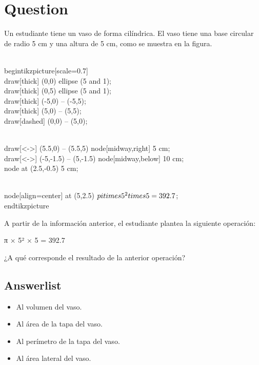 \documentclass[
]{article}
\author{}
\date{\vspace{-2.5em}}
\providecommand{\tightlist}{%
  \setlength{\itemsep}{0pt}\setlength{\parskip}{0pt}}
\begin{document}
\section{Question}\label{question}

Un estudiante tiene un vaso de forma cilíndrica. El vaso tiene una base
circular de radio 5 cm y una altura de 5 cm, como se muestra en la
figura.

\begin{center}
\\begin{tikzpicture}[scale=0.7]
  \\draw[thick] (0,0) ellipse (5 and 1);
  \\draw[thick] (0,5) ellipse (5 and 1);
  \\draw[thick] (-5,0) -- (-5,5);
  \\draw[thick] (5,0) -- (5,5);
  \\draw[dashed] (0,0) -- (5,0);
  
  \\draw[<->] (5.5,0) -- (5.5,5) node[midway,right] {5 cm};
  \\draw[<->] (-5,-1.5) -- (5,-1.5) node[midway,below] {10 cm};
  \\node at (2.5,-0.5) {5 cm};
  
  \\node[align=center] at (5,2.5) {$\\pi \\times 5^2 \\times 5 = 392.7$};
\\end{tikzpicture}
\end{center}

A partir de la información anterior, el estudiante plantea la siguiente
operación:

π × 5² × 5 = 392.7

¿A qué corresponde el resultado de la anterior operación?

\subsection{Answerlist}\label{answerlist}

\begin{itemize}
\tightlist
\item
  Al volumen del vaso.
\item
  Al área de la tapa del vaso.
\item
  Al perímetro de la tapa del vaso.
\item
  Al área lateral del vaso.
\end{itemize}
\end{document}
